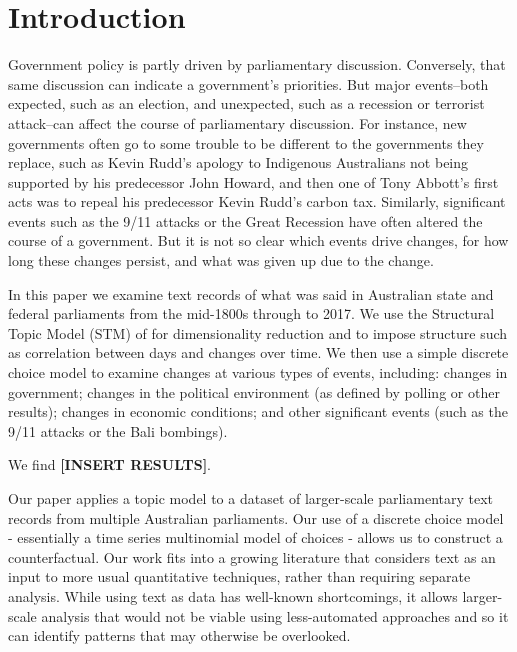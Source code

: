 \documentclass[12pt,]{article}
\theoremstyle{definition}
\theoremstyle{definition}
\theoremstyle{definition}
\theoremstyle{remark}
\begin{document}
\vskip 6.5pt


\noindent  \section{Introduction}\label{introduction}

Government policy is partly driven by parliamentary discussion.
Conversely, that same discussion can indicate a government's priorities.
But major events--both expected, such as an election, and unexpected,
such as a recession or terrorist attack--can affect the course of
parliamentary discussion. For instance, new governments often go to some
trouble to be different to the governments they replace, such as Kevin
Rudd's apology to Indigenous Australians not being supported by his
predecessor John Howard, and then one of Tony Abbott's first acts was to
repeal his predecessor Kevin Rudd's carbon tax. Similarly, significant
events such as the 9/11 attacks or the Great Recession have often
altered the course of a government. But it is not so clear which events
drive changes, for how long these changes persist, and what was given up
due to the change.

In this paper we examine text records of what was said in Australian
state and federal parliaments from the mid-1800s through to 2017. We use
the Structural Topic Model (STM) of \citet{RobertsStewartAiroldi2016}
for dimensionality reduction and to impose structure such as correlation
between days and changes over time. We then use a simple discrete choice
model to examine changes at various types of events, including: changes
in government; changes in the political environment (as defined by
polling or other results); changes in economic conditions; and other
significant events (such as the 9/11 attacks or the Bali bombings).

We find \textbf{{[}INSERT RESULTS{]}}.

Our paper applies a topic model to a dataset of larger-scale
parliamentary text records from multiple Australian parliaments. Our use
of a discrete choice model - essentially a time series multinomial model
of choices - allows us to construct a counterfactual. Our work fits into
a growing literature that considers text as an input to more usual
quantitative techniques, rather than requiring separate analysis. While
using text as data has well-known shortcomings, it allows larger-scale
analysis that would not be viable using less-automated approaches and so
it can identify patterns that may otherwise be overlooked.
\end{document}
